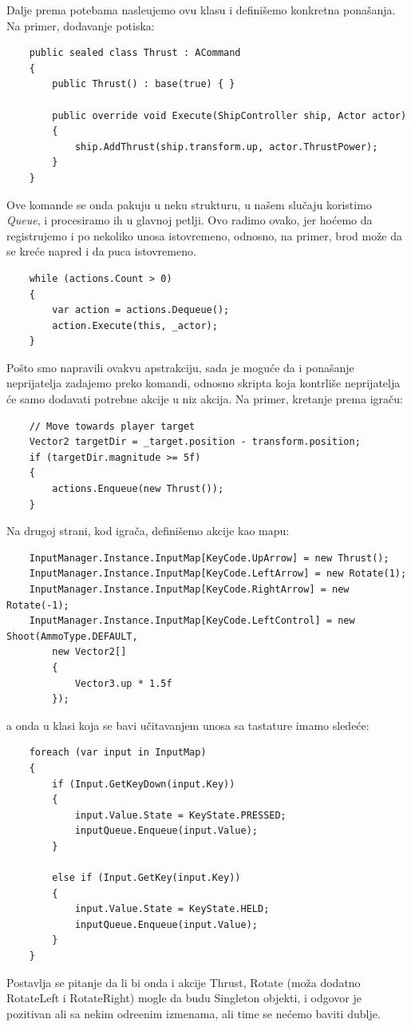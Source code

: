 Dalje prema potebama nasle\dj ujemo ovu klasu i defini\v{s}emo konkretna pona\v{s}anja. Na primer,
dodavanje potiska:

\begin{verbatim}
    public sealed class Thrust : ACommand
    {
        public Thrust() : base(true) { }

        public override void Execute(ShipController ship, Actor actor)
        {
            ship.AddThrust(ship.transform.up, actor.ThrustPower);
        }
    }
\end{verbatim}

Ove komande se onda pakuju u neku strukturu, u na\v{s}em slu\v{c}aju koristimo \emph{Queue}, 
i procesiramo ih u glavnoj petlji. Ovo radimo ovako, jer ho\'cemo da registrujemo i po nekoliko
unosa istovremeno, odnosno, na primer, brod mo\v{z}e da se kre\'ce napred i da puca istovremeno.

\begin{verbatim}
    while (actions.Count > 0)
    {
        var action = actions.Dequeue();
        action.Execute(this, _actor);
    }
\end{verbatim}

Po\v{s}to smo napravili ovakvu apstrakciju, sada je mogu\'ce da i pona\v{s}anje neprijatelja
zadajemo preko komandi, odnosno skripta koja kontrli\v{s}e neprijatelja \'ce samo dodavati potrebne
akcije u niz akcija. Na primer, kretanje prema igra\v{c}u:

\begin{verbatim}
    // Move towards player target
    Vector2 targetDir = _target.position - transform.position;
    if (targetDir.magnitude >= 5f)
    {
        actions.Enqueue(new Thrust());
    }
\end{verbatim}

Na drugoj strani, kod igra\v{c}a, defini\v{s}emo akcije kao mapu:

\begin{verbatim}
    InputManager.Instance.InputMap[KeyCode.UpArrow] = new Thrust();
    InputManager.Instance.InputMap[KeyCode.LeftArrow] = new Rotate(1);
    InputManager.Instance.InputMap[KeyCode.RightArrow] = new Rotate(-1);
    InputManager.Instance.InputMap[KeyCode.LeftControl] = new Shoot(AmmoType.DEFAULT,
        new Vector2[]
        {
            Vector3.up * 1.5f
        });
\end{verbatim}

a onda u klasi koja se bavi u\v{c}itavanjem unosa sa tastature imamo slede\'ce:

\begin{verbatim}
    foreach (var input in InputMap)
    {
        if (Input.GetKeyDown(input.Key))
        {
            input.Value.State = KeyState.PRESSED;
            inputQueue.Enqueue(input.Value);
        }

        else if (Input.GetKey(input.Key))
        {
            input.Value.State = KeyState.HELD;
            inputQueue.Enqueue(input.Value);
        }
    }
\end{verbatim}

Postavlja se pitanje da li bi onda i akcije Thrust, Rotate (mo\v{z}a dodatno RotateLeft i RotateRight) mogle da budu
Singleton objekti, i odgovor je pozitivan ali sa nekim odre\dj enim izmenama, ali time se ne\'cemo baviti dublje.
